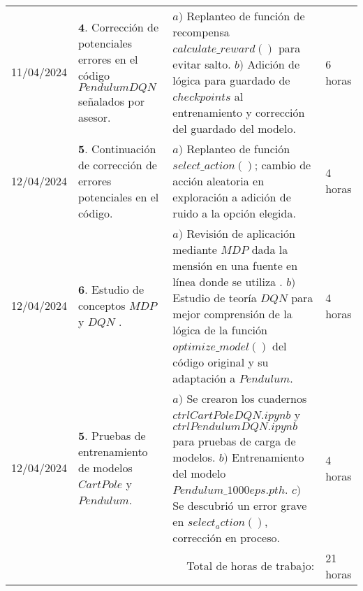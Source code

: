 \documentclass[12pt]{article}
\begin{document}
\hfill\\
\begin{minipage}[h]{\textwidth}
	\centering
	\begin{tabularx}{\textwidth}{|p{2cm}|X|X|p{2cm}|} 
		\hline		
		
	 	11/04/2024 & 
	 	$\mathbf{4}.$ Corrección de potenciales errores en el código $PendulumDQN$ señalados por asesor. &
	 	$a)$ Replanteo de función de recompensa $calculate\_ reward()$ para evitar salto. \newline
	 	$b)$ Adición de lógica para guardado de $checkpoints$ al entrenamiento y corrección del guardado del modelo. \newline & 
	 	6 horas \\
	 	12/04/2024 & 
	 	$\mathbf{5}.$ Continuación de corrección de errores potenciales en el código. &
	 	$a)$ Replanteo de función $select\_ action()$; cambio de acción aleatoria en exploración a adición de ruido a la opción elegida. \newline & 
	 	4 horas \\
	 	12/04/2024 & 
	 	$\mathbf{6}.$ Estudio de conceptos $MDP$ \cite{PAlvaradoMDP1} y $DQN$ \cite{PAlvaradoDQN1} . &
	 	$a)$ Revisión de aplicación mediante $MDP$ dada la mensión en una fuente en línea donde se utiliza \cite{CartPoleRLcrtl1}. \newline
	 	$b)$ Estudio de teoría $DQN$ para mejor comprensión de la lógica de la función $optimize\_ model()$ del código original \cite{DQNCart} y su adaptación a $Pendulum$. \newline & 
	 	4 horas \\
	 	12/04/2024 & 
	 	$\mathbf{5}.$ Pruebas de entrenamiento de modelos $CartPole$ y $Pendulum$. &
	 	$a)$ Se crearon los cuadernos $ctrlCartPoleDQN.ipynb$ y $ctrlPendulumDQN.ipynb$ para pruebas de carga de modelos. \newline
	 	$b)$ Entrenamiento del modelo $Pendulum\_1000eps.pth$. \newline
	 	$c)$ Se descubrió un error grave en $select_action()$, corrección en proceso. \newline & 
	 	4 horas \\
	 	
	 	\hline
		\multicolumn{3}{|r|}{Total de horas de trabajo:} & 21 horas \\ 
	 	\hline                 
	\end{tabularx}
\end{minipage}
\end{document}
